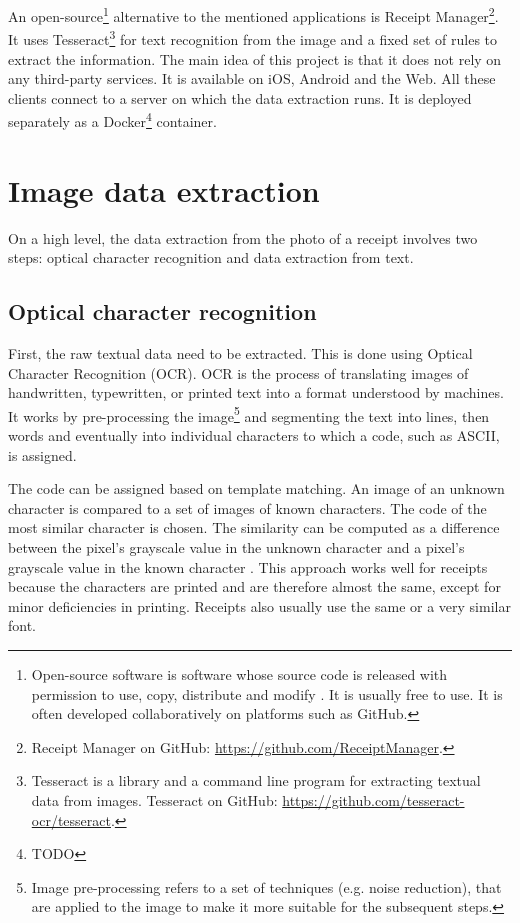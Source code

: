\documentclass[
  digital, %
  table,   %
  oneside, %
  lof,     %
  lot,     %
]{fithesis3}
\begin{document}
An open-source\footnote{Open-source software is software whose source code is released with permission to use, copy, distribute and modify \cite{GartnerOpenSource}. It is usually free to use. It is often developed collaboratively on platforms such as GitHub.} alternative to the mentioned applications is Receipt Manager\footnote{Receipt Manager on GitHub: \url{https://github.com/ReceiptManager}.}.
It uses Tesseract\footnote{Tesseract is a library and a command line program for extracting textual data from images. Tesseract on GitHub: \url{https://github.com/tesseract-ocr/tesseract}.} for text recognition from the image and a fixed set of rules to extract the information. The main idea of this project is that it does not rely on any third-party services.
It is available on iOS, Android and the Web. All these clients connect to a server on which the data extraction runs. It is deployed separately as a Docker\footnote{TODO} container.

\chapter{Image data extraction}
On a high level, the data extraction from the photo of a receipt involves two steps: optical character recognition and data extraction from text.

\section{Optical character recognition}
First, the raw textual data need to be extracted. This is done using Optical Character Recognition (OCR). OCR is the process of translating images of handwritten, typewritten, or printed text into a format understood by machines.
It works by pre-processing the image\footnote{Image pre-processing refers to a set of techniques (e.g. noise reduction), that are applied to the image to make it more suitable for the subsequent steps.} and segmenting the text into lines, then words and eventually into individual characters to which a code, such as ASCII, is assigned. \cite{Shreya2019OCRCNN}

The code can be assigned based on template matching. An image of an unknown character is compared to a set of images of known characters. The code of the most similar character is chosen. The similarity can be computed as a difference between the pixel's grayscale value in the unknown character and a pixel's grayscale value in the known character \cite{Ziegaus2016TemplateMatching}.
This approach works well\cite{Ziegaus2016TemplateMatching} for receipts because the characters are printed and are therefore almost the same, except for minor deficiencies in printing. Receipts also usually use the same or a very similar font.
\end{document}
